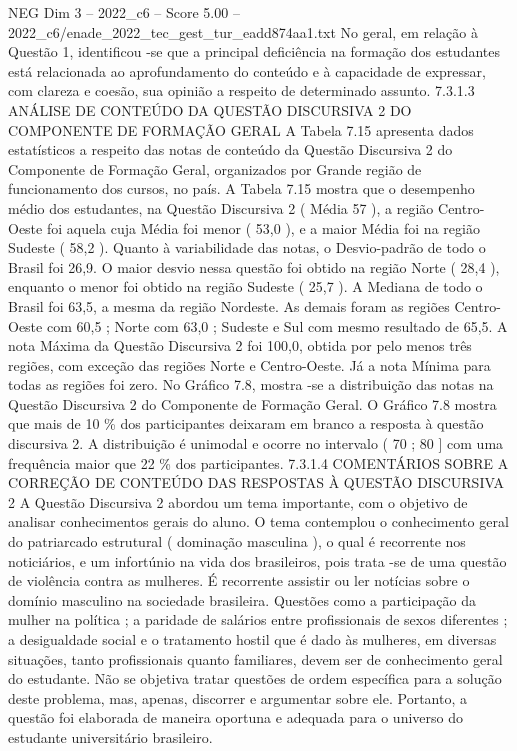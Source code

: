 \begin{textsample}{NEG Dim 3 – 2022\_c6 – Score 5.00 – 2022\_c6/enade\_2022\_tec\_gest\_tur\_eadd874aa1.txt}
No geral, em relação à Questão 1, identificou -se que a principal deficiência na formação dos estudantes está relacionada ao aprofundamento do conteúdo e à capacidade de expressar, com clareza e coesão, sua opinião a respeito de determinado assunto. 7.3.1.3 ANÁLISE DE CONTEÚDO DA QUESTÃO DISCURSIVA 2 DO COMPONENTE DE FORMAÇÃO GERAL A Tabela 7.15 apresenta dados estatísticos a respeito das notas de conteúdo da Questão Discursiva 2 do Componente de Formação Geral, organizados por Grande região de funcionamento dos cursos, no país.
A Tabela 7.15 mostra que o desempenho médio dos estudantes, na Questão Discursiva 2 ( Média 57 ), a região Centro-Oeste foi aquela cuja Média foi menor ( 53,0 ), e a maior Média foi na região Sudeste ( 58,2 ).
Quanto à variabilidade das notas, o Desvio-padrão de todo o Brasil foi 26,9.
O maior desvio nessa questão foi obtido na região Norte ( 28,4 ), enquanto o menor foi obtido na região Sudeste ( 25,7 ).
A Mediana de todo o Brasil foi 63,5, a mesma da região Nordeste.
As demais foram as regiões Centro-Oeste com 60,5 ; Norte com 63,0 ; Sudeste e Sul com mesmo resultado de 65,5.
A nota Máxima da Questão Discursiva 2 foi 100,0, obtida por pelo menos três regiões, com exceção das regiões Norte e Centro-Oeste.
Já a nota Mínima para todas as regiões foi zero.
No Gráfico 7.8, mostra -se a distribuição das notas na Questão Discursiva 2 do Componente de Formação Geral.
O Gráfico 7.8 mostra que mais de 10 \% dos participantes deixaram em branco a resposta à questão discursiva 2.
A distribuição é unimodal e ocorre no intervalo ( 70 ; 80 ] com uma frequência maior que 22 \% dos participantes. 7.3.1.4 COMENTÁRIOS SOBRE A CORREÇÃO DE CONTEÚDO DAS RESPOSTAS À QUESTÃO DISCURSIVA 2 A Questão Discursiva 2 abordou um tema importante, com o objetivo de analisar conhecimentos gerais do aluno.
O tema contemplou o conhecimento geral do patriarcado estrutural ( dominação masculina ), o qual é recorrente nos noticiários, e um infortúnio na vida dos brasileiros, pois trata -se de uma questão de violência contra as mulheres.
É recorrente assistir ou ler notícias sobre o domínio masculino na sociedade brasileira.
Questões como a participação da mulher na política ; a paridade de salários entre profissionais de sexos diferentes ; a desigualdade social e o tratamento hostil que é dado às mulheres, em diversas situações, tanto profissionais quanto familiares, devem ser de conhecimento geral do estudante.
Não se objetiva tratar questões de ordem específica para a solução deste problema, mas, apenas, discorrer e argumentar sobre ele.
Portanto, a questão foi elaborada de maneira oportuna e adequada para o universo do estudante universitário brasileiro.

\end{textsample}
